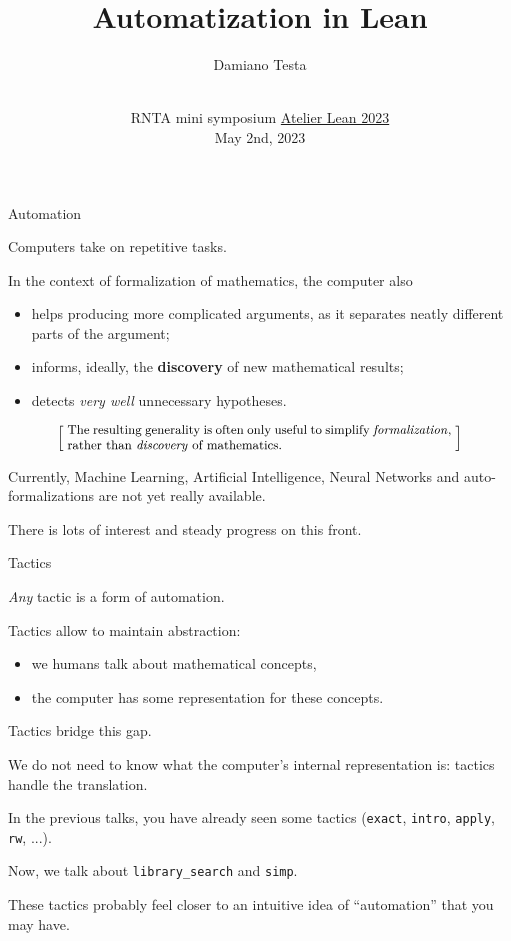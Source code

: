 \documentclass{beamer}
\title{Automatization in Lean}
\author{Damiano Testa}
\institute[]{University of Warwick}
\date[\href{http://www.rnta.eu/7MSRNTA/lean.html}{Atelier Lean 2023}]{\\
\vspace{50pt}
RNTA mini symposium
\href{http://www.rnta.eu/7MSRNTA/lean.html}{Atelier Lean 2023}\\
\vspace{20pt}
May 2nd, 2023
}
\begin{document}
\frame{\titlepage}

\begin{frame}[fragile]
{Automation}

Computers take on repetitive tasks.
\bigskip

In the context of formalization of mathematics, the computer also

\begin{itemize}
\item
  helps producing more complicated arguments, as it separates neatly different parts of the argument;
\item
  informs, ideally, the {\textbf{discovery}} of new mathematical results;
\item
  detects {\emph{very well}} unnecessary hypotheses.
\end{itemize}

\smallskip
\[
  \left[ \;
  \makebox{\parbox{0.8\textwidth}{\small
  The resulting generality is often only useful to simplify {\emph{formalization}}, rather than {\emph{discovery}} of mathematics.
  }}
  \; \right]
\]
\bigskip

Currently, Machine Learning, Artificial Intelligence, Neural Networks and auto-formalizations are not yet really available.
\bigskip

There is lots of interest and steady progress on this front.
\end{frame}

\begin{frame}[fragile]{Tactics}

{\emph{Any}} tactic is a form of automation.
\bigskip

Tactics allow to maintain abstraction:

\begin{itemize}
\item
  we humans talk about mathematical concepts,
\item
  the computer has some representation for these concepts.
\end{itemize}
\bigskip

Tactics bridge this gap.
\bigskip

We do not need to know what the computer's internal representation is: tactics handle the translation.
\end{frame}

\begin{frame}[fragile]

In the previous talks, you have already seen some tactics ({\color{purple}\verb`exact`}, {\color{purple}\verb`intro`}, {\color{purple}\verb`apply`}, {\color{purple}\verb`rw`}, ...).
\bigskip

Now, we talk about {\color{purple}\verb`library_search`} and {\color{purple}\verb`simp`}.
\bigskip

These tactics probably feel closer to an intuitive idea of ``automation'' that you may have.
\end{frame}
\end{document}
